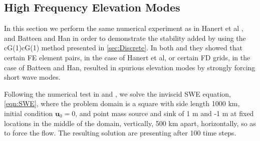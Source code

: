 \subsection{High Frequency Elevation Modes} \label{sse:ElevModes}
  In this section we perform the same numerical experiment as in Hanert et al
  \cite{Hanert2002}, and Batteen and Han \cite{Batteen1981} in order to
  demonstrate the stability added by using the cG(1)cG(1) method presented in
  \autoref{sec:Discrete}. In both \cite{Hanert2002} and \cite{Batteen1981} they
  showed that certain FE element pairs, in the case of Hanert et al, or certain FD
  grids, in the case of Batteen and Han, resulted in spurious elevation modes by
  strongly forcing short wave modes.

  Following the numerical test in \cite{Hanert2002} and \cite{Batteen1981}, we
  solve the inviscid SWE equation, \eqref{eqn:SWE}, where the problem domain is
  a square with side length 1000 km, initial condition $\mathbf{u}_0 = 0$, and
  point mass source and sink of 1 m and -1 m at fixed locations in the middle of
  the domain, vertically, 500 km apart, horizontally, so as to force the flow.
  The resulting solution are presenting after 100 time steps.
